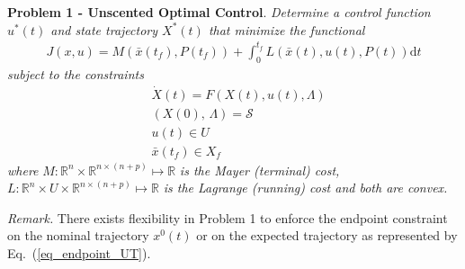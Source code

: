 \documentclass[10pt,a4paper]{article}
\begin{document}
	\\\\
	\textbf{Problem 1 - Unscented Optimal Control}. \textit{Determine a control function $ u^*(t) $ and state trajectory $ X^*(t) $ that minimize the functional}
		\begin{align}
		J(x,u) = M(\bar{x}(t_f),P(t_f)) + \int_{0}^{t_f}L(\bar{x}(t),u(t),P(t))\mathrm{d}t
		\end{align}
		\textit{subject to the constraints }
		\begin{align}
		&\dot{X}(t) = F(X(t),u(t),\Lambda) \\
		&(X(0),\,\Lambda) = \mathcal{S} \\
		&u(t) \in U \\
		&\bar{x}(t_f) \in X_f \label{eq_endpoint_UT}
		\end{align}
	\textit{where} $ M:\mathbb{R}^{n}\times\mathbb{R}^{n\times (n+p)}\mapsto \mathbb{R} $ \textit{is the Mayer (terminal) cost,} $L:\mathbb{R}^{n}\times U\times\mathbb{R}^{n\times (n+p)}\mapsto\mathbb{R}$ \textit{ is the Lagrange (running) cost and both are convex.}
		
	\textit{Remark.} There exists flexibility in Problem 1 to enforce the endpoint constraint on the nominal trajectory $x^0(t)$ or on the expected trajectory as represented by Eq.~(\ref{eq_endpoint_UT}).
	
	
		
	
	
\end{document}
